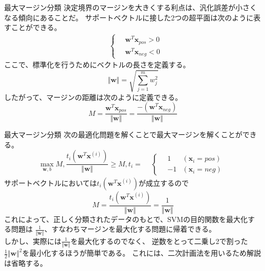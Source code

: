 \documentclass[aspectratio=169, dvipdfmx, 11pt]{beamer} %
\begin{document}
\begin{frame}{最大マージン分類}
    決定境界のマージンを大きくする利点は、汎化誤差が小さくなる傾向にあることだ。
    サポートベクトルに接した2つの超平面は次のように表すことができる。
    \begin{equation*}
        \begin{aligned}
            & \left\{ \,
                \begin{aligned}
                    & \bm{w}^T \bm{x}_{pos} > 0 \\
                    & \bm{w}^T \bm{x}_{neg} < 0
                \end{aligned}
            \right.
        \end{aligned}
    \end{equation*}
    ここで、標準化を行うためにベクトルの長さを定義する。
    \begin{equation*}
        \Vert\bm{w}\Vert = \sqrt{{\textstyle \sum_{j=1}^{m} w_{j}^{2}}}
    \end{equation*}
    したがって、マージンの距離は次のように定義できる。
    \begin{equation*}
        M = \frac{\bm{w}^T \bm{x}_{pos}}{\Vert\bm{w}\Vert}
        =\frac{-(\bm{w}^T \bm{x}_{neg})}{\Vert\bm{w}\Vert}
    \end{equation*}
\end{frame}

\begin{frame}{最大マージン分類}
    次の最適化問題を解くことで最大マージンを解くことができる。
    \begin{equation*}
        \max_{\bm{w}, b} M,
        \frac{t_i(\bm{w}^T \bm{x}^{(i)})}{\Vert\bm{w}\Vert} \geq M,
        t_i =
        \begin{aligned}
            & \left\{ \,
                \begin{aligned}
                    & 1  & (\bm{x}_i = pos) \\
                    & -1 & (\bm{x}_i = neg)
                \end{aligned}
            \right.
        \end{aligned}
    \end{equation*}
    サポートベクトルにおいては\(t_i(\bm{w}^T \bm{x}^{(i)})\)が成立するので
    \begin{equation*}
        M = \frac{t_i(\bm{w}^T \bm{x}^{(i)})}{\Vert\bm{w}\Vert} = \frac{1}{\Vert\bm{w}\Vert}
    \end{equation*}
    これによって、正しく分類されたデータのもとで、SVMの目的関数を最大化する問題は
    \(\frac{1}{\Vert\bm{w}\Vert}\)、すなわちマージンを最大化する問題に帰着できる。\\
    しかし、実際には\(\frac{1}{\Vert\bm{w}\Vert}\)を最大化するのでなく、
    逆数をとって二乗し2で割った\(\frac{1}{2}\Vert\bm{w}\Vert^2\)を最小化するほうが簡単である。
    これには、二次計画法を用いるため解説は省略する。
\end{frame}
\end{document}

